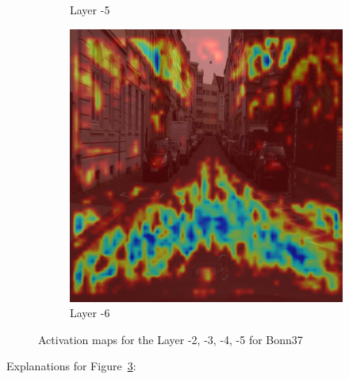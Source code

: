 \begin{figure}
\begin{subfigure}[b]{0.49\textwidth}
        \caption{Layer -5}
        \label{fig:c-5}
    \end{subfigure}
    \hfill
    \begin{subfigure}[b]{0.49\textwidth}
        \centering
        \includegraphics[width=\textwidth]{figures/bonn_000037_000019_leftImg8bit.pnglayer-6/bonn_000037_000019_leftImg8bit.png_object(0)_heatmap}
        \caption{Layer -6}
        \label{fig:c-6}
    \end{subfigure}
    \hfill

    \caption{Activation maps for the Layer -2, -3, -4, -5 for Bonn37}
    \label{fig:Bonn-000037-000019}
\end{figure}
Explanations for Figure~\ref{fig:Bonn-000037-000019}:
